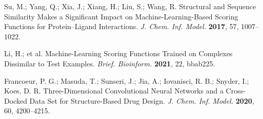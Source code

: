 Su, M.; Yang, Q.; Xia, J.; Xiang, H.; Liu, S.; Wang, R. Structural and Sequence Similarity Makes a Significant Impact on Machine-Learning-Based Scoring Functions for Protein–Ligand Interactions. \textit{J. Chem. Inf. Model.} \textbf{2017}, 57, 1007--1022. %



Li, H.; et al. Machine-Learning Scoring Functions Trained on Complexes Dissimilar to Test Examples. \textit{Brief. Bioinform.} \textbf{2021}, 22, bbab225. %

Francoeur, P. G.; Masuda, T.; Sunseri, J.; Jia, A.; Iovanisci, R. B.; Snyder, I.; Koes, D. R. Three-Dimensional Convolutional Neural Networks and a Cross-Docked Data Set for Structure-Based Drug Design. \textit{J. Chem. Inf. Model.} \textbf{2020}, 60, 4200--4215. %